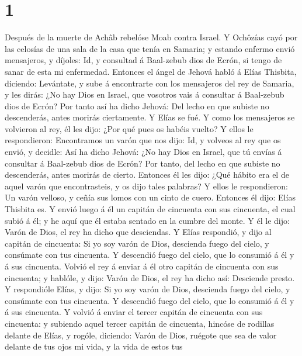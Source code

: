 \hypertarget{section}{%
\section{1}\label{section}}

 Después de la muerte de Achâb rebelóse Moab contra Israel.
 Y Ochôzías cayó por las celosías de una sala de la casa que
tenía en Samaria; y estando enfermo envió mensajeros, y díjoles: Id, y
consultad á Baal-zebub dios de Ecrón, si tengo de sanar de esta mi
enfermedad.  Entonces el ángel de Jehová habló á Elías
Thisbita, diciendo: Levántate, y sube á encontrarte con los mensajeros
del rey de Samaria, y les dirás: ¿No hay Dios en Israel, que vosotros
vais á consultar á Baal-zebub dios de Ecrón?  Por tanto así
ha dicho Jehová: Del lecho en que subiste no descenderás, antes morirás
ciertamente. Y Elías se fué.  Y como los mensajeros se
volvieron al rey, él les dijo: ¿Por qué pues os habéis vuelto?
 Y ellos le respondieron: Encontramos un varón que nos dijo:
Id, y volveos al rey que os envió, y decidle: Así ha dicho Jehová: ¿No
hay Dios en Israel, que tú envías á consultar á Baal-zebub dios de
Ecrón? Por tanto, del lecho en que subiste no descenderás, antes morirás
de cierto.  Entonces él les dijo: ¿Qué hábito era el de
aquel varón que encontrasteis, y os dijo tales palabras?  Y
ellos le respondieron: Un varón velloso, y ceñía sus lomos con un cinto
de cuero. Entonces él dijo: Elías Thisbita es.  Y envió
luego á él un capitán de cincuenta con sus cincuenta, el cual subió á
él; y he aquí que él estaba sentado en la cumbre del monte. Y él le
dijo: Varón de Dios, el rey ha dicho que desciendas.  Y
Elías respondió, y dijo al capitán de cincuenta: Si yo soy varón de
Dios, descienda fuego del cielo, y consúmate con tus cincuenta. Y
descendió fuego del cielo, que lo consumió á él y á sus cincuenta.
 Volvió el rey á enviar á él otro capitán de cincuenta con
sus cincuenta; y hablóle, y dijo: Varón de Dios, el rey ha dicho así:
Desciende presto.  Y respondióle Elías, y dijo: Si yo soy
varón de Dios, descienda fuego del cielo, y consúmate con tus cincuenta.
Y descendió fuego del cielo, que lo consumió á él y á sus cincuenta.
 Y volvió á enviar el tercer capitán de cincuenta con sus
cincuenta: y subiendo aquel tercer capitán de cincuenta, hincóse de
rodillas delante de Elías, y rogóle, diciendo: Varón de Dios, ruégote
que sea de valor delante de tus ojos mi vida, y la vida de estos tus

